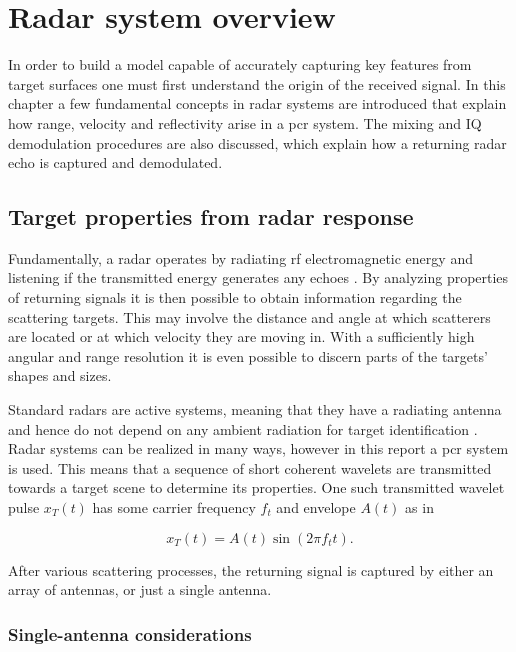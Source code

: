 \chapter{Radar system overview}

In order to build a model capable of accurately capturing key features from target surfaces one must first understand the origin of the received signal. In this chapter a few fundamental concepts in radar systems are introduced that explain how range, velocity and reflectivity arise in a \gls{pcr} system. The mixing and IQ demodulation procedures are also discussed, which explain how a returning radar echo is captured and demodulated. 

\section{Target properties from radar response}
Fundamentally, a radar operates by radiating \gls{rf} electromagnetic energy and listening if the transmitted energy generates any echoes \citep{skolnik_2009}. By analyzing properties of returning signals it is then possible to obtain information regarding the scattering targets. This may involve the distance and angle at which scatterers are located or at which velocity they are moving in. With a sufficiently high angular and range resolution it is even possible to discern parts of the targets' shapes and sizes.  

Standard radars are active systems, meaning that they have a radiating antenna and hence do not depend on any ambient radiation for target identification \citep{richards_2014}. Radar systems can be realized in many ways, however in this report a \gls{pcr} system is used. This means that a sequence of short coherent wavelets are transmitted towards a target scene to determine its properties. One such transmitted wavelet pulse $x_T(t)$ has some carrier frequency $f_t$ and envelope $A(t)$ as in

\begin{equation}\label{eq:trans}
	x_T(t)
	= A(t)\sin(2\pi f_t t).
\end{equation}

After various scattering processes, the returning signal is captured by either an array of antennas, or just a single antenna.

\subsection{Single-antenna considerations}

